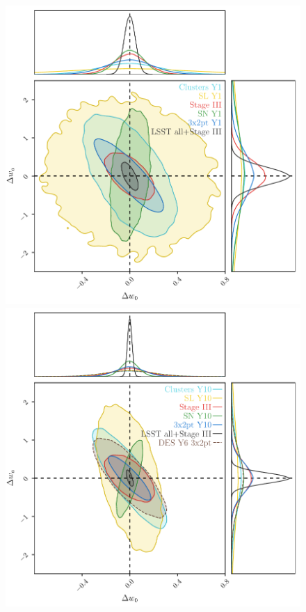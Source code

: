 \begin{figure}
  \begin{center}
    \includegraphics[width=0.999\linewidth]{LSST_Y1_Aug13.pdf}
    \includegraphics[width=0.999\linewidth]{DESC_SRD_DES_LSST_Y10.pdf}

\end{center}
\end{figure}
